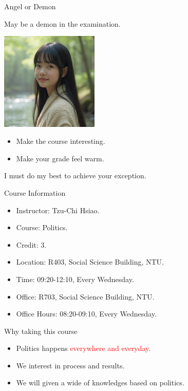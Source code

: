 \documentclass{beamer}
\begin{document}
\begin{frame}{Angel or Demon}
\begin{minipage}{0.4\textwidth}
\begin{center}
\end{center}
\begin{center}
May be a demon in the examination.
\end{center}
\end{minipage}
\end{frame}
\begin{frame}{}
\begin{center}
\includegraphics[width=0.35\textwidth]{tchsiao.png}
\end{center}
\begin{itemize}
\item Make the course interesting.
\item Make your grade feel warm.
\end{itemize}
I must do my best to achieve your exception.
\end{frame}
\begin{frame}{Course Information}
\begin{itemize}
\item Instructor: Tzu-Chi Hsiao.
\item Course: Politics.
\item Credit: 3.
\item Location: R403, Social Science Building, NTU.
\item Time: 09:20-12:10, Every Wednesday.
\item Office: R703, Social Science Building, NTU.
\item Office Hours: 08:20-09:10, Every Wednesday.
\end{itemize}
\end{frame}
\begin{frame}{Why taking this course}
\begin{itemize}
\item Politics happens \textcolor{red}{everywhere and everyday}.
\item We interest in process and results.
\item We will given a wide of knowledges based on politics.
\end{itemize}
\end{frame}
\end{document}
